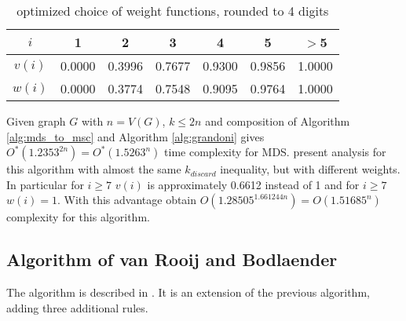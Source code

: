 \begin{table}[ht]
    \centering
    \begin{tabular}{c|c|c|c|c|c|c}
        $i$ & 1 & 2 & 3 & 4 & 5 & $>$5 \\
        \hline
        $v(i)$ & 0.0000 & 0.3996 & 0.7677 & 0.9300 & 0.9856 & 1.0000 \\
        \hline
        $w(i)$ & 0.0000 & 0.3774 & 0.7548 & 0.9095 & 0.9764 & 1.0000 \\
        \hline
    \end{tabular}
    \caption{optimized choice of weight functions, rounded to 4 digits}
\end{table}

Given graph $G$ with $n = V(G)$, $k\leq 2n$ and composition of Algorithm \ref{alg:mds_to_msc} and Algorithm \ref{alg:grandoni} gives $O^*(1.2353^{2n}) = O^*(1.5263^n)$ time complexity for MDS. \citeauthor{VANROOIJ20112147} \cite{VANROOIJ20112147} present analysis for this algorithm with almost the same $k_{discard}$ inequality, but with different weights. In particular for $i\geq 7$ $v(i)$ is approximately 0.6612 instead of 1 and for $i\geq 7$ $w(i) = 1$. With this advantage \citeauthor{VANROOIJ20112147} obtain $O(1.28505^{1.661244n}) = O(1.51685^n)$ complexity for this algorithm.
\subsection{Algorithm of van Rooij and Bodlaender}
The algorithm is described in \cite{VANROOIJ20112147}. It is an extension of the previous algorithm, adding three additional rules.


